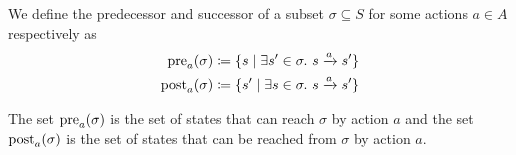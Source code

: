 



% 







\begin{definition}
    We define the predecessor and successor of a subset $\sigma\subseteq S$ for some actions $a\in A$ respectively as 
    \begin{align*}
         \operatorname{pre}_a(\sigma) \coloneqq \{ s \mid  \exists s' \in \sigma.\ s \xrightarrow{a} s' \} \\
          \operatorname{post}_a(\sigma) \coloneqq \{ s' \mid \exists s \in \sigma.\ s \xrightarrow{a} s' \} 
    \end{align*}
\end{definition}

\begin{remark}
    The set $\operatorname{pre}_a(\sigma)$ is the set of states that can reach $\sigma$ by action $a$ and the set $\operatorname{post}_a(\sigma)$ is the set of states that can be reached from $\sigma$ by action $a$.
    \begin{center}
    \end{center}
\end{remark}

